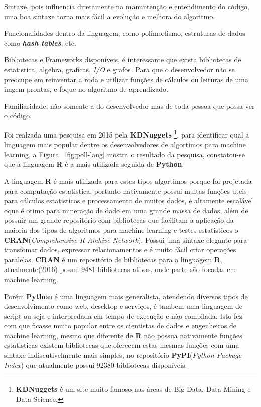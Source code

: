 \begin{alineas}
    \item Sintaxe, pois influencia diretamente na manuntenção e entendimento do código, uma boa sintaxe torna mais fácil a evolução e melhora do algoritmo.
    \item Funcionalidades dentro da linguagem, como polimorfismo, estruturas de dados como \textbf{\textit{hash tables}}, etc. 
    \item Bibliotecas e Frameworks disponíveis, é interessante que exista bibliotecas de estatistica, algebra, graficas, \textit{I/O} e grafos. Para que
          o desenvolvedor não se preocupe em reinventar a roda e utilizar funções de cálculos ou leituras de uma imgem prontas, e foque no algoritmo de 
          aprendizado.
    \item Familiaridade, não somente a do desenvolvedor mas de toda pessoa que possa ver o código.     
\end{alineas}

Foi realzada uma pesquisa em 2015 pela \textbf{KDNuggets} \footnote{\textbf{KDNuggets} é um site muito famoso nas áreas de Big Data, Data Mining e Data Science.}, para identificar qual a linguagem mais popular dentre os desenvolvedores de algortimos para 
machine learning, a Figura ~\ref{fig:poll-lang} mostra o resultado da pesquisa, constatou-se que a linguagem \textbf{R} é a mais utilizada seguida de 
\textbf{Python}.   


A linguagem \textbf{R} é mais utilizada para estes tipos algortimos porque foi projetada para computação estatistica, portanto 
nativamente possui muitas funções uteis para cálculos estatisticos e processamento de muitos dados, é 
altamente escalável oque é otimo para mineração de dado em uma grande massa de dados, além de possuir um grande repositório com 
bibliotecas que facilitam a aplicação da maioria dos tipos de algoritmos para machine learning e testes estatisticos o 
\textbf{CRAN}(\textit{Comprehensive R Archive Network}). 
Possui uma sintaxe elegante para transfomar dados, expressar relacionamentos e é muito fácil criar operações paralelas.
\textbf{CRAN} é um repositório de bibliotecas para a linguagem \textbf{R}, atualmente(2016) possui 9481 bibliotecas ativas, 
onde parte são focadas em machine learning.


Porém \textbf{Python} é uma linguagem mais generalista, atendendo diversos tipos de desenvolvimento como web, descktop e serviços, 
é tambem uma linguagem de script ou seja e interpredada em tempo de execução e não compilada. 
Isto fez com que ficasse muito popular entre os cientistas de dados e engenheiros de machine learning, mesmo que diferente de 
\textbf{R} não possua nativamente funções estatisticas existem bibliotecas que oferecem estas mesmas funções com uma sintaxe
indiscutivelmente mais simples, no repositório \textbf{PyPI}(\textit{Python Package Index}) que atualmente possui 92380 bibliotecas disponíveis.      

